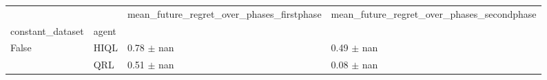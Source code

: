 \begin{tabular}{llll}
\toprule
 &  & mean_future_regret_over_phases_firstphase & mean_future_regret_over_phases_secondphase \\
constant_dataset & agent &  &  \\
\midrule
\multirow[t]{2}{*}{False} & HIQL & 0.78 $\pm$ nan & 0.49 $\pm$ nan \\
 & QRL & 0.51 $\pm$ nan & 0.08 $\pm$ nan \\
\cline{1-4}
\bottomrule
\end{tabular}

